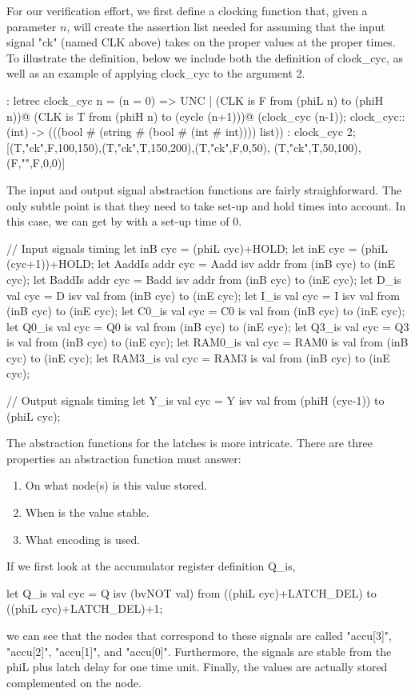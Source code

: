 For our verification effort, we first define a clocking function
that, given a parameter $n$, will create the assertion list needed
for assuming that the input signal "ck" (named CLK above) takes on
the proper values at the proper times.
To illustrate the definition, below we include both the definition
of clock\_cyc, as well as an example of applying clock\_cyc to the argument 2.
\begin{hol}
: letrec clock\_cyc n = (n = 0) => UNC |
    (CLK is F from (phiL n) to (phiH n))@
    (CLK is T from (phiH n) to (cycle (n+1)))@
    (clock\_cyc (n-1));
clock\_cyc::(int) -> (((bool # (string # (bool # (int # int)))) list))
: clock\_cyc 2;
[(T,"ck",F,100,150),(T,"ck",T,150,200),(T,"ck",F,0,50),
 (T,"ck",T,50,100),(F,"",F,0,0)]
\end{hol}
The input and output signal abstraction functions are fairly
straighforward.
The only subtle point is that they need to take set-up and hold times into
account.
In this case, we can get by with a set-up time of $0$.
\begin{hol}
// Input signals timing
let inB cyc = (phiL cyc)+HOLD;
let inE cyc = (phiL (cyc+1))+HOLD;
let AaddIs addr cyc = Aadd isv addr from (inB cyc) to (inE cyc);
let BaddIs addr cyc = Badd isv addr from (inB cyc) to (inE cyc);
let D\_is val cyc = D isv val from (inB cyc) to (inE cyc);
let I\_is val cyc = I isv val from (inB cyc) to (inE cyc);
let C0\_is val cyc = C0 is val from (inB cyc) to (inE cyc);
let Q0\_is val cyc = Q0 is val from (inB cyc) to (inE cyc);
let Q3\_is val cyc = Q3 is val from (inB cyc) to (inE cyc);
let RAM0\_is val cyc = RAM0 is val from (inB cyc) to (inE cyc);
let RAM3\_is val cyc = RAM3 is val from (inB cyc) to (inE cyc);

// Output signals timing
let Y\_is val cyc = Y isv val from (phiH (cyc-1)) to (phiL cyc);
\end{hol}

The abstraction functions for the latches is more intricate.
There are three properties an abstraction function must
answer:
\begin{enumerate}
\item
On what node(s) is this value stored.
\item
When is the value stable.
\item
What encoding%
%
{} is used.
\end{enumerate}
If we first look at the accumulator register definition Q\_is,
\begin{hol}
let Q\_is val cyc = Q isv (bvNOT val)
		    from ((phiL cyc)+LATCH\_DEL) to ((phiL cyc)+LATCH\_DEL)+1;
\end{hol}
we can see that the nodes that correspond to these signals are
called "accu[3]", "accu[2]", "accu[1]", and "accu[0]".
Furthermore, the signals are stable from the phiL plus latch delay
for one time unit.
Finally, the values are actually stored complemented%
%
{} on the node.

